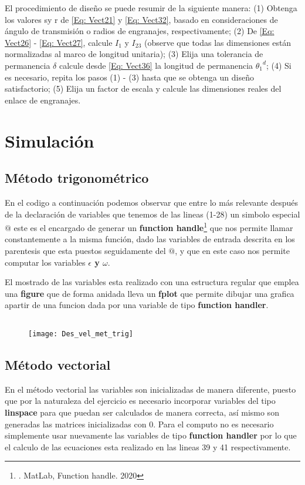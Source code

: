 \documentclass[12pt, final]{extarticle}
\begin{document}
El procedimiento de diseño se puede resumir de la siguiente manera: (1) Obtenga
los valores sy r de \eqref{Eq: Vect21} y \eqref{Eq: Vect32}, basado en
consideraciones de ángulo de transmisión o radios de engranajes,
respectivamente; (2) De \eqref{Eq: Vect26} - \eqref{Eq: Vect27}, calcule $I_1$ y
$I_{23}$ (observe que todas las dimensiones están normalizadas al marco de
longitud unitaria); (3) Elija una tolerancia de permanencia $\delta$ calcule
desde \eqref{Eq: Vect36} la longitud de permanencia ${\theta_1}^d$; (4) Si es
necesario, repita los pasos (1) - (3) hasta que se obtenga un diseño
satisfactorio; (5) Elija un factor de escala y calcule las dimensiones reales
del enlace de engranajes.

\newpage
\section{Simulación}
\subsection{Método trigonométrico}
En el codigo a continuación podemos observar que entre lo más relevante después
de la declaración de variables que tenemos de las lineas (1-28) un simbolo
especial $@$ este es el encargado de generar un \textbf{function
handle}\footnote{\cite{Mat2020}. MatLab, Function handle. 2020} que nos permite
llamar constantemente a la misma función, dado las variables de entrada descrita
en los parentesis que esta puestos seguidamente del $@$, y que en este caso nos
permite computar los variables \textbf{$\epsilon$ y $\omega$}.

El mostrado de las variables esta realizado con una estructura regular que
emplea una \textbf{figure} que de forma anidada lleva un \textbf{fplot} que
permite dibujar una grafica apartir de una funcion dada por una variable de tipo
\textbf{function handler}.
{\small
\inputminted{matlab}{Codigos/ADA5_metodo_trig.m}}

\begin{figure}[ht]
    \centering
    \texttt{[image: Des\_vel\_met\_trig]}
\end{figure}

\newpage
\subsection{Método vectorial}
En el método vectorial las variables son inicializadas de manera diferente,
puesto que por la naturaleza del ejercicio es necesario incorporar variables del
tipo \textbf{linspace} para que puedan ser calculados de manera correcta, así
mismo son generadas las matrices inicializadas con 0. Para el computo no es
necesario simplemente usar nuevamente las variables de tipo \textbf{function
handler} por lo que el calculo de las ecuaciones esta realizado en las lineas 39
y 41 respectivamente.
\end{document}
